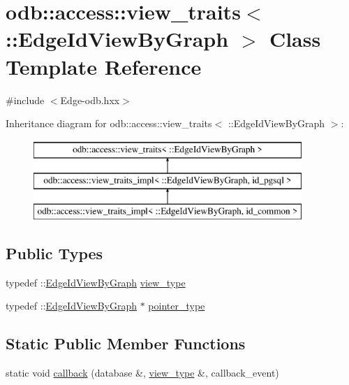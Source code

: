 \hypertarget{classodb_1_1access_1_1view__traits_3_01_1_1_edge_id_view_by_graph_01_4}{}\section{odb\+:\+:access\+:\+:view\+\_\+traits$<$ \+:\+:Edge\+Id\+View\+By\+Graph $>$ Class Template Reference}
\label{classodb_1_1access_1_1view__traits_3_01_1_1_edge_id_view_by_graph_01_4}


{\ttfamily \#include $<$Edge-\/odb.\+hxx$>$}

Inheritance diagram for odb\+:\+:access\+:\+:view\+\_\+traits$<$ \+:\+:Edge\+Id\+View\+By\+Graph $>$\+:\begin{figure}[H]
\begin{center}
\leavevmode
\includegraphics[height=3.000000cm]{de/da5/classodb_1_1access_1_1view__traits_3_01_1_1_edge_id_view_by_graph_01_4}
\end{center}
\end{figure}
\subsection*{Public Types}
\begin{DoxyCompactItemize}
\item 
typedef \+::\hyperlink{struct_edge_id_view_by_graph}{Edge\+Id\+View\+By\+Graph} \hyperlink{classodb_1_1access_1_1view__traits_3_01_1_1_edge_id_view_by_graph_01_4_a5c878e1df6ba367e257b6da8fcb92cae}{view\+\_\+type}
\item 
typedef \+::\hyperlink{struct_edge_id_view_by_graph}{Edge\+Id\+View\+By\+Graph} $\ast$ \hyperlink{classodb_1_1access_1_1view__traits_3_01_1_1_edge_id_view_by_graph_01_4_af29800df5429b9fae24c13bd68b7b271}{pointer\+\_\+type}
\end{DoxyCompactItemize}
\subsection*{Static Public Member Functions}
\begin{DoxyCompactItemize}
\item 
static void \hyperlink{classodb_1_1access_1_1view__traits_3_01_1_1_edge_id_view_by_graph_01_4_abebead8d19b270159180c8649a42e979}{callback} (database \&, \hyperlink{classodb_1_1access_1_1view__traits_3_01_1_1_edge_id_view_by_graph_01_4_a5c878e1df6ba367e257b6da8fcb92cae}{view\+\_\+type} \&, callback\+\_\+event)
\end{DoxyCompactItemize}


